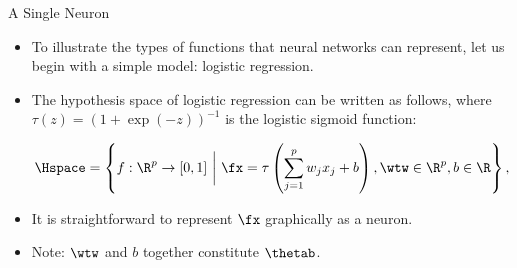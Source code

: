 







\begin{frame} {A Single Neuron}
\begin{itemize}
\item To illustrate the types of functions that neural networks can represent, let us begin with a simple model: logistic regression.
\vspace{5mm}
\item The hypothesis space of logistic regression can be written as follows, where $\tau(z) = (1 + \exp(-z))^{-1}$ is the logistic sigmoid function:
\begin{small} 
$$\Hspace = \left\{f: \R^p \to [0, 1] ~\bigg|~ \fx = \tau\left(\sum_{j = 1}^p w_j x_j + b\right), \wtw \in \R^p, b \in \R \right\},$$ \end{small}
\vspace{3mm}
\item It is straightforward to represent $\fx$ graphically as a neuron.
\vspace{5mm}
\item Note: $\wtw$ and $b$ together constitute $\thetab$.
\end{itemize}
\end{frame}

